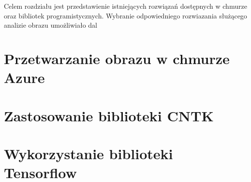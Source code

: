 Celem rozdziału jest przedstawienie istniejących rozwiązań dostępnych w chmurze oraz bibliotek programistycznych. Wybranie odpowiedniego rozwiazania służącego analizie obrazu umożliwiało dal



\section{Przetwarzanie obrazu w chmurze Azure} 

\section{Zastosowanie biblioteki CNTK}

\section{Wykorzystanie biblioteki Tensorflow}
